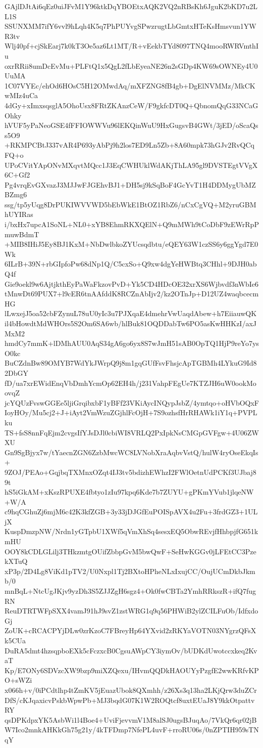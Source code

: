GAjlDJtAi6qEz0uiJFvM1Y96ktkDqYBOEtxAQK2VQ2nRBsKh6JguK2bKD7u2LL1S
SSUNXMM7ifY6vvl9hLqh4K5q7PhPUYvgSPwzrugtLbGmtxHTeKsHmsvun1YWR3tv
Wlj40pf+cjSkEarj7k0kT3Oe5az6Lt1MT/R+vEekbTYd8097TNQ4mooRWRVmthIu
oxrRRii8umDcEvMu+PLFtQ1x5QgL2fLbEyeaNE26n2sGDp4KW69sOWNEy4U0UuMA
1C07VYEc/ehOd6HOsC5H12OMwdAq/mXFZNG8fB4gb+DgElNVMMz/MkCKwMIz4uCa
4dGy+xImxsqsglA5OhoUsx8FRtZKAnzCeW/F9gkfcDT0Q+QbnomQqG33NCaGOhky
hVUF5yPaNeoGSE4fFFIOWWVu96lEKQinWuU9HxGugsvB4GWt/3jED/oScaQss5O9
+RKMPCBtJ337vAR4P693yAbPj9h2los7ED9Ln5Zb+8A60mpk73hGJv2RvQCqFQ+o
UPoCVitYApONvMXqvtMQcc1J3EqCWHUklWdAKjThLA95gl9DVSTEgtVVgX6C+Gf2
Pg4vrqEvGXvazJ3MJJwFJGEhvBJ1+DH5sj9kSqBoF4GcYvT1H4DDMygUbMZBZmg6
ssg/tp5yUqg8DrPUKIWVVWD5bEbWkE1BtOZ1RbZ6/nCxCgVQ+M2yruGBMhUYIRas
i/bxHx7upcA1SoNL+NL0+xYB8EhmRKXQElN+Q9mMWh9tCoDbF9zEWrRpPmuwBdmT
+MIB8IHiJ5Ey8BJ1KxM+NbDwlbkoZYUcsqdbtu/eQEY63W1czSS6y6ggYgd7E0Wk
6ILrB+39N+rbGIpfoPw68dNp1Q/C5cxSo+Q9xw4dgYeHWBtq3CHhl+9DJH0abQ4f
Gie9oekl9w6AjtjkthEyPaWaFkzovPvD+Yk5CD4HDcOE32xrXS6Wjbvdf3nWbIe6
tMnwDt69PUX7+l9cER6tnAAfddK8RCZnAbIjv2/kz2OTnJp+D12UZ4waqbcecmHG
lLwxejJ5oa52cbFZynuL78uU0yIc3u7PJXqaE4dmehrVwUaqdAbew+h7EiiauwQK
il4bHowdtMdWHOrs5S2Om6SA6wb/hlBuk81OQDDabTw6PO5asKwHHKzI/axJMxM2
hmdCy7mmK+lDMhAUU0AqS34gA6go6yx8S7wJmH51sAB0OpTQ1HjP9reYo7ysO0kc
BuCZdnBw89OMYB7WdYkJWrpQ9j8m1gqGUfFsvFhsjcApTGBMh4LYkuG9Id82DbGY
fD/ua7xrEWidEnqVbDmhYcmOp62EH4h/j231VahpFEgUe7KTZJH6uW0ookMoovqZ
jcYQUzFvswGGEe5ljiGrqibxbF1yBFf23VKiAycINQypJsbZ/4ymtqo+oHVbOQxF
IoyHOy/Mu5cj2+J+iAyt2VmWzuZGjhlFcOjH+7S9ozhsfHrRHAWk1iY1q+PVPLku
TS+fsS8nnFqEjm2cvgsIfYJsDJl0cbiWI8VRLQ2PxIpkNsCMGpGVFgw+4U06ZWXU
Gn9SgBjyx7w/tYaecnZGN6ZzbMwcWC8LVNobXraAqbvVstQ/hulW4ryOseEkqIs+
9ZOJ/PEAo+GqjbqTXMnxOZqt4IJ3tv5bdizhEWhzI2FWlOetnUdPCKf3UJbaj89t
hS5iGkAM+xKszRPUXE4fbtyo1zIu97kpq6Kde7b7ZUYU+gPKmYVub1jlqeNW+W/A
c9hqCGhuZj6mjM6c42K3kfZGB+3y33jDJGfEuPOISpAVX4u2Fu+3frdGZ3+1ULjX
KuspDmzpNW/Nrdn1yGTpbU1XWf5qVmXhSq4sesxEQ5ObwREvjfHhbpjfG651kmHU
OOY8kCDLGLilj3THkzmtgOUifZbbpGvM5bwQwF+SeHwKGGv0jLFEtCC3PzekXTuQ
xP3p/2D4Lg8ViKd1pTV2/U0Nxpl1Tj2BXtoHPheNLxIxujCC/OujUCmDkbJkmb/0
mnBqL+NtcUgJKjv9yzDh3S5ZJJZgH6sgz4+Ok0fwCBTa2YmhRRkszR+ifQ7fugRN
ReuDTRTWFpSXX4vamJ91hJ9svZ1zstWRG1q9q56PHWiB2ylZCILFuOb/IdfxdoGj
ZoUK+cRCACPYjDLw0zrKzoC7FBreyHp64YXvid2zRKYaVOTN03NYgrzQFsXk5CUa
DuRA5dmt4hzsqpboEXk5cFczxcB0CgsuAWpCY3iymOv/bUDKdUwotccxkeq2KvaT
Kp/E7ONy6SDVzcXW9bzp9miXZQexu/IHvmQQDkHAOUYyPzgfE2wwKRfvKPO+sWZi
x066h+v/0iPCdtlhp4tZmKV5jEuazUbok8QXmhh/z26Xs3q13ha2LKjQrw3duZCr
DfS/cKJqaxicvPskbWpwPb+MJ3bqdG07K1W2ROQtcf8uxtEUaJ8Y9kkOtpattvRY
qsDPKdpxYK5AsbWi1l4Boe4+UviFjevvmV1M8alSJ0ugsBJuqAo/7VkQr6qr02jB
W7Ico2mnkAHKkGh75g21y/4kTFDmp7NfePL4uvF+rroRU06s/0nZPTIH959sTNqY
